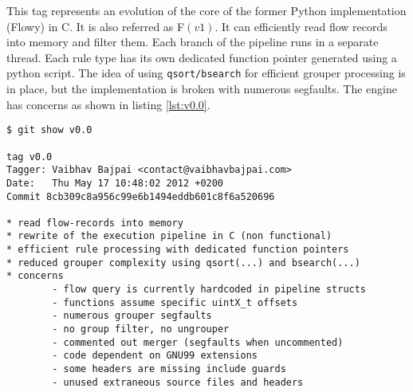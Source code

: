 This tag represents an evolution of the core of the former Python
implementation (Flowy) in C. It is also referred as F$(v1)$. It can
efficiently read flow records into memory and filter them. Each branch of the
pipeline runs in a  separate thread. Each rule type
has its own dedicated function pointer generated using a python script. The
idea of using \texttt{qsort/bsearch} for efficient grouper processing is in
place, but the implementation is broken with numerous segfaults. The engine
has concerns as shown in listing \ref{lst:v0.0}.

\begin{lstlisting}
$ git show v0.0

tag v0.0
Tagger: Vaibhav Bajpai <contact@vaibhavbajpai.com>
Date:   Thu May 17 10:48:02 2012 +0200
Commit 8cb309c8a956c99e6b1494eddb601c8f6a520696

* read flow-records into memory
* rewrite of the execution pipeline in C (non functional)
* efficient rule processing with dedicated function pointers
* reduced grouper complexity using qsort(...) and bsearch(...)
* concerns
        - flow query is currently hardcoded in pipeline structs
        - functions assume specific uintX_t offsets
        - numerous grouper segfaults
        - no group filter, no ungrouper
        - commented out merger (segfaults when uncommented)
        - code dependent on GNU99 extensions
        - some headers are missing include guards
        - unused extraneous source files and headers
\end{lstlisting}

